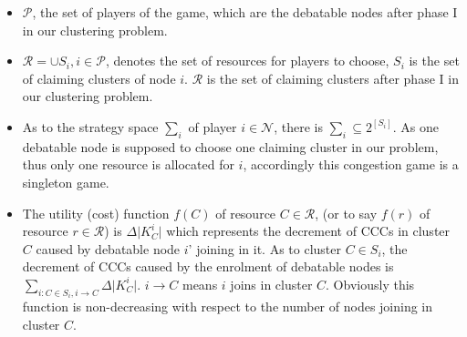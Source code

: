 \documentclass[10pt,journal,compsoc]{IEEEtran}
\theoremstyle{mytheoremstyle}
\theoremstyle{mytheoremstyle}
\theoremstyle{mytheoremstyle}
\begin{document}

\begin{itemize}
	\item $\mathcal{P}$, the set of players of the game, which are the debatable nodes after phase I in our clustering problem.
	\item $\mathcal{R} = \cup S_i, i\in \mathcal{P}$, denotes the set of resources for players to choose, $S_i$ is the set of claiming clusters of node $i$. $\mathcal{R}$ is the set of claiming clusters after phase I in our clustering problem.
	\item As to the strategy space $\sum_i$ of player $i\in \mathcal{N}$, there is $\sum_i \subseteq 2^{\left[S_i\right]}$. As one debatable node is supposed to choose one claiming cluster in our problem, thus only one resource is allocated for $i$, accordingly this congestion game is a singleton game.
	
	
	\item %
	The utility (cost) function $f(C)$ of resource $C\in \mathcal{R}$, (or to say $f(r)$ of resource $r \in \mathcal{R}$) is $\Delta\vert K^i_C \vert$ which represents the decrement of CCCs in cluster $C$ caused by debatable node $i$' joining in it.
	As to cluster $C\in S_i$, the decrement of CCCs caused by the enrolment of debatable nodes is $\sum_{i:C\in S_i, i\rightarrow C} \Delta\vert K^i_C \vert$. 
$i\rightarrow C$ means $i$ joins in cluster $C$.
Obviously this function is non-decreasing with respect to the number of nodes joining in cluster $C$.
	

\end{itemize}
\end{document}
